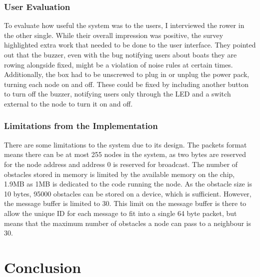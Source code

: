 \documentclass[12pt,a4paper]{report}
\newcommand{\newchapter}[2]{
    \setcounter{chapter}{#1}
    \setcounter{section}{0}
    \chapter*{#2}
    \addcontentsline{toc}{chapter}{#1 #2}
}
\begin{document}
\subsection{User Evaluation}
To evaluate how useful the system was to the users, I interviewed the rower in the other single. While their overall impression was positive, the survey highlighted extra work that needed to be done to the user interface. They pointed out that the buzzer, even with the bug notifying users about boats they are rowing alongside fixed, might be a violation of noise rules at certain times. Additionally, the box had to be unscrewed to plug in or unplug the power pack, turning each node on and off. These could be fixed by including another button to turn off the buzzer, notifying users only through the LED and a switch external to the node to turn it on and off. \\

\subsection{Limitations from the Implementation}
There are some limitations to the system due to its design. The packets format means there can be at most 255 nodes in the system, as two bytes are reserved for the node address and address 0 is reserved for broadcast. The number of obstacles stored in memory is limited by the available memory on the chip, 1.9MB as 1MB is dedicated to the code running the node. As the obstacle size is 10 bytes, 95000 obstacles can be stored on a device, which is sufficient. However, the message buffer is limited to 30. This limit on the message buffer is there to allow the unique ID for each message to fit into a single 64 byte packet, but means that the maximum number of obstacles a node can pass to a neighbour is 30.

\newchapter{5}{Conclusion}
\setcounter{figure}{0}
\end{document}
